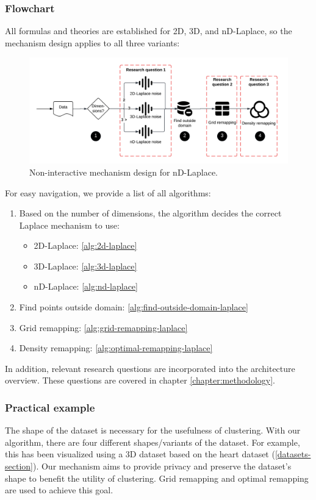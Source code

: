 \subsubsection{Flowchart}
All formulas and theories are established for 2D, 3D, and nD-Laplace, so the mechanism design applies to all three variants:
\begin{figure}[h]
  \includegraphics[width=1.1\textwidth]{TheorethicalFramework//ND-Laplace//Images/Thesis-nd - final-mechanism-design.png}
  \caption{Non-interactive mechanism design for nD-Laplace.}
  \label{fig:final-mechanism-design}
\end{figure}
For easy navigation, we provide a list of all algorithms:
\begin{enumerate}
  \item Based on the number of dimensions, the algorithm decides the correct Laplace mechanism to use:
        \begin{itemize}
          \item 2D-Laplace:  \ref{alg:2d-laplace}
          \item 3D-Laplace: \ref{alg:3d-laplace}
          \item nD-Laplace: \ref{alg:nd-laplace}
        \end{itemize}
  \item Find points outside domain: \ref{alg:find-outside-domain-laplace}
  \item Grid remapping: \ref{alg:grid-remapping-laplace}
  \item Density remapping: \ref{alg:optimal-remapping-laplace}
\end{enumerate}
In addition, relevant research questions are incorporated into the architecture overview.
These questions are covered in chapter \ref{chapter:methodology}.
\subsubsection{Practical example}
The shape of the dataset is necessary for the usefulness of clustering.
With our algorithm, there are four different shapes/variants of the dataset.
For example, this has been visualized using a 3D dataset based on the heart dataset (\ref{datasets-section}).
Our mechanism aims to provide privacy and preserve the dataset's shape to benefit the utility of clustering.
Grid remapping and optimal remapping are used to achieve this goal.


